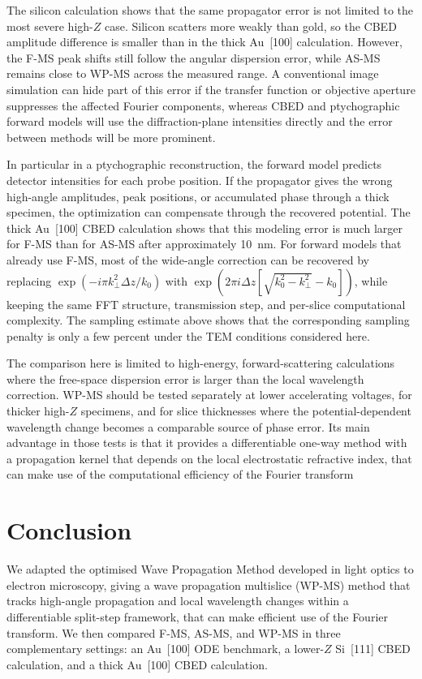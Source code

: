 \documentclass[preprint,12pt,number]{elsarticle}
\begin{document}
The silicon calculation shows that the same propagator error is not limited to
the most severe high-$Z$ case. Silicon scatters more weakly than gold, so the
CBED amplitude difference is smaller than in the thick Au~[100] calculation.
However, the F-MS peak shifts still follow the angular dispersion error, while
AS-MS remains close to WP-MS across the measured range. A conventional image
simulation can hide part of this error if the transfer function or objective
aperture suppresses the affected Fourier components, whereas CBED and ptychographic
forward models will use the diffraction-plane intensities directly and the error 
between methods will be more prominent.

In particular in a ptychographic reconstruction, the forward model predicts detector
intensities for each probe position. If the propagator gives the wrong
high-angle amplitudes, peak positions, or accumulated phase through a thick
specimen, the optimization can compensate through the recovered potential. The
thick Au~[100] CBED calculation shows that this modeling error is much larger
for F-MS than for AS-MS after approximately 10~nm. For forward models that
already use F-MS, most of the wide-angle correction can be recovered by
replacing
$\exp(-i\pi k_\perp^2 \Delta z/k_0)$ with
$\exp(2\pi i\Delta z[\sqrt{k_0^2-k_\perp^2}-k_0])$, while keeping the same FFT structure,
transmission step, and per-slice computational complexity. The sampling estimate
above shows that the corresponding sampling penalty is only a few percent under
the TEM conditions considered here.

The comparison here is limited to high-energy, forward-scattering calculations
where the free-space dispersion error is larger than the local wavelength
correction. WP-MS should be tested separately at lower accelerating voltages,
for thicker high-$Z$ specimens, and for slice thicknesses where the
potential-dependent wavelength change becomes a comparable source of phase
error. Its main advantage in those tests is that it provides a differentiable
one-way method with a propagation kernel that depends on the local
electrostatic refractive index, that can make use of the computational efficiency 
of the Fourier transform

\section{Conclusion}

We adapted the optimised Wave Propagation Method developed in light optics to
electron microscopy, giving a wave propagation multislice (WP-MS) method that
tracks high-angle propagation and local wavelength changes within a
differentiable split-step framework, that can make efficient use of the Fourier transform. We then compared F-MS, AS-MS, and WP-MS in
three complementary settings: an Au~[100] ODE benchmark, a lower-$Z$ Si~[111]
CBED calculation, and a thick Au~[100] CBED calculation.
\end{document}
